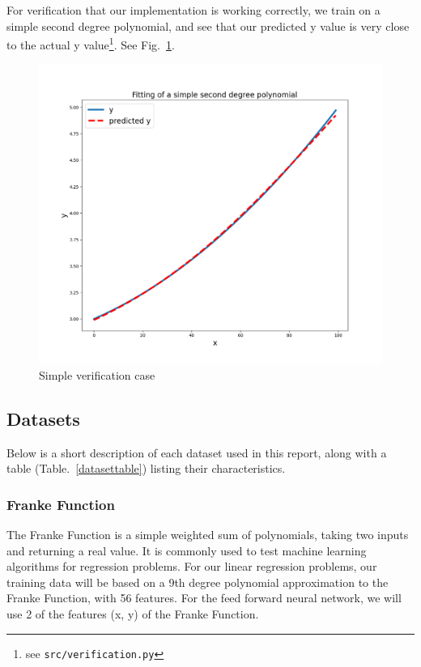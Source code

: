 \documentclass[onecolumn,10pt,cleanfoot]{asme2ej}
\begin{document}
For verification that our implementation is working correctly, we train on a simple second degree polynomial, and see that our predicted y value is very close to the actual y value\footnote{see \texttt{src/verification.py}}. See Fig.~\ref{verification}.

\begin{figure}[h]
\centerline{\includegraphics[width=5in]{figure/verification.png}}
\caption{Simple verification case}
\label{verification}
\end{figure}

\subsection{Datasets}

Below is a short description of each dataset used in this report, along with a table (Table.~\ref{datasettable}) listing their characteristics.

\subsubsection{Franke Function}

The Franke Function is a simple weighted sum of polynomials, taking two inputs and returning a real value. It is commonly used to test machine learning algorithms for regression problems. For our linear regression problems, our training data will be based on a 9th degree polynomial approximation to the Franke Function, with 56 features. For the feed forward neural network, we will use 2 of the features (x, y) of the Franke Function.
\end{document}
